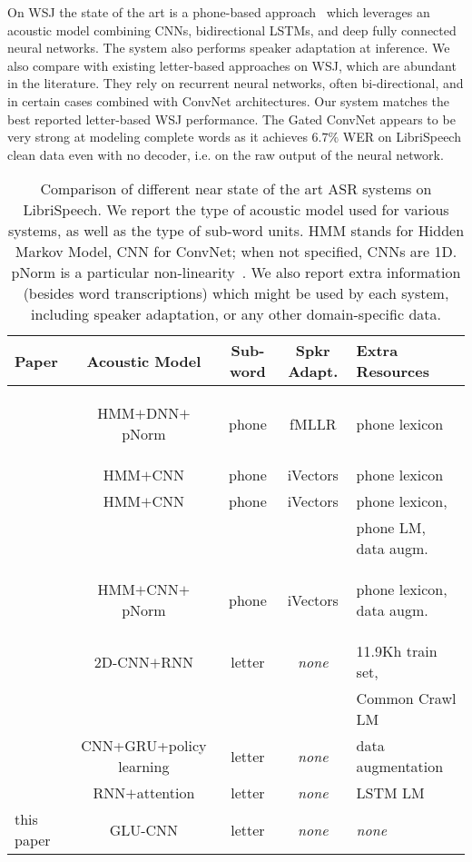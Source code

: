 \documentclass{article}
\begin{document}
On WSJ the state of the art is a phone-based approach~\citep{chan2015rnn} which leverages an acoustic model
combining CNNs, bidirectional LSTMs, and deep fully connected neural
networks. The system also performs speaker adaptation at inference. We also
compare with existing letter-based approaches on WSJ, which are abundant in
the literature. They rely on recurrent neural networks, often
bi-directional, and in certain cases combined with ConvNet
architectures. Our system matches the best reported letter-based WSJ
performance. The Gated ConvNet appears to be very strong at modeling
complete words as it achieves $6.7\%$ WER on LibriSpeech clean data even with no decoder,
i.e. on the raw output of the neural network.





\begin{table*}
  \caption{Comparison of different near state of the art ASR systems on
    LibriSpeech. We report the type of acoustic model used for various
    systems, as well as the type of sub-word units. HMM stands for Hidden
    Markov Model, CNN for ConvNet; when not specified, CNNs are 1D. pNorm
    is a particular non-linearity~\citep{zhang2014pnorm}. We also report
    extra information (besides word transcriptions) which might be used by
    each system, including speaker adaptation, or any other domain-specific
    data. }
    \label{tbl-systems}
    \begin{center}
\setlength{\tabcolsep}{3.2pt}
    \small
    \begin{tabular}{lcccl}
      \toprule
      Paper & Acoustic Model & Sub-word & Spkr Adapt. & Extra Resources \\ \midrule
      \cite{panayotov2015librispeech} & \begin{scriptsize}HMM$+$DNN$+$pNorm\end{scriptsize} & phone & fMLLR & phone lexicon \\
      \cite{peddinti2015time} & HMM$+$CNN & phone & iVectors & phone lexicon \\
      \cite{povey2016mmi} & HMM$+$CNN & phone & iVectors & phone lexicon, \\
      &  &  &  & phone LM, data augm.\\
      \cite{ko2015audio} & \begin{scriptsize}HMM$+$CNN$+$pNorm\end{scriptsize} & phone & iVectors & phone lexicon, data augm. \\
      \midrule
        \cite{amodei2015deep} & 2D-CNN$+$RNN & letter & \emph{none} & 11.9Kh train set, \\
        &  &  &  & Common Crawl LM \\
        \cite{zhou2018policy} & CNN+GRU+policy learning & letter & \emph{none} & data augmentation \\
      \cite{zeyer2018improved} & RNN$+$attention & letter & \emph{none} & LSTM LM \\
      this paper & GLU-CNN & letter & \emph{none} & \emph{none} \\
      \bottomrule
    \end{tabular}
    \end{center}
\end{table*}
\end{document}
